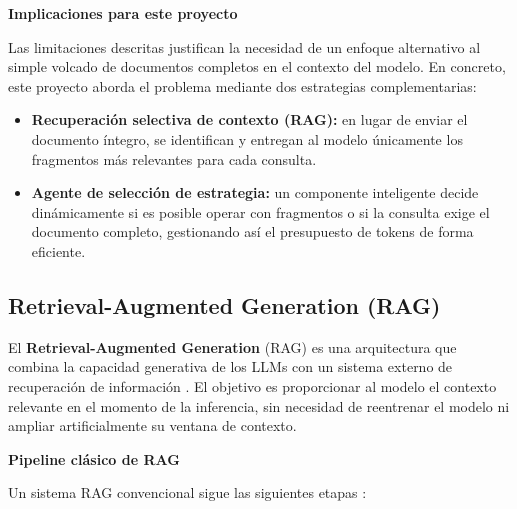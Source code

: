 \vspace{0.3cm}
\textbf{Implicaciones para este proyecto}

Las limitaciones descritas justifican la necesidad de un enfoque alternativo al simple volcado de documentos completos en el contexto del modelo. En concreto, este proyecto aborda el problema mediante dos estrategias complementarias:

\begin{itemize}
    \item \textbf{Recuperación selectiva de contexto (RAG):} en lugar de enviar el documento íntegro, se identifican y entregan al modelo únicamente los fragmentos más relevantes para cada consulta.
    \item \textbf{Agente de selección de estrategia:} un componente inteligente decide dinámicamente si es posible operar con fragmentos o si la consulta exige el documento completo, gestionando así el presupuesto de tokens de forma eficiente.
\end{itemize}

\newpage
\subsection{Retrieval-Augmented Generation (RAG)}

El \textbf{Retrieval-Augmented Generation} (RAG) es una arquitectura que combina la capacidad generativa de los LLMs con un sistema externo de recuperación de información \cite{Lewis2020}. El objetivo es proporcionar al modelo el contexto relevante en el momento de la inferencia, sin necesidad de reentrenar el modelo ni ampliar artificialmente su ventana de contexto.

\vspace{0.3cm}
\textbf{Pipeline clásico de RAG}

Un sistema RAG convencional sigue las siguientes etapas \cite{Gao2023}:

